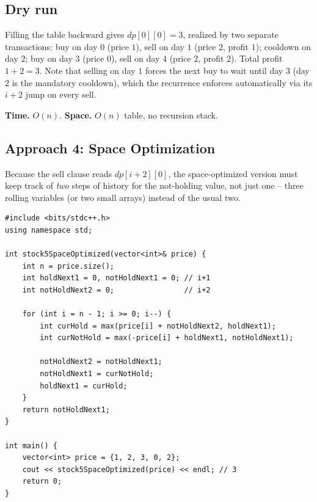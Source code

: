 \subsection*{Dry run}


Filling the table backward gives $\textit{dp}[0][0]=3$, realized by two
separate transactions: buy on day $0$ (price $1$), sell on day $1$
(price $2$, profit $1$); cooldown on day $2$; buy on day $3$ (price
$0$), sell on day $4$ (price $2$, profit $2$). Total profit
$1+2=3$. Note that selling on day $1$ forces the next buy to wait until
day $3$ (day $2$ is the mandatory cooldown), which the recurrence
enforces automatically via its $i{+}2$ jump on every sell.

\begin{complexitybox}
\textbf{Time.} $O(n)$.
\textbf{Space.} $O(n)$ table, no recursion stack.
\end{complexitybox}

\subsection*{Approach 4: Space Optimization}

\begin{ideabox}
Because the sell clause reads $\textit{dp}[i+2][0]$, the space-optimized
version must keep track of \emph{two} steps of history for the
not-holding value, not just one -- three rolling variables (or two small
arrays) instead of the usual two.
\end{ideabox}

\begin{lstlisting}
#include <bits/stdc++.h>
using namespace std;

int stock5SpaceOptimized(vector<int>& price) {
    int n = price.size();
    int holdNext1 = 0, notHoldNext1 = 0; // i+1
    int notHoldNext2 = 0;                // i+2

    for (int i = n - 1; i >= 0; i--) {
        int curHold = max(price[i] + notHoldNext2, holdNext1);
        int curNotHold = max(-price[i] + holdNext1, notHoldNext1);

        notHoldNext2 = notHoldNext1;
        notHoldNext1 = curNotHold;
        holdNext1 = curHold;
    }
    return notHoldNext1;
}

int main() {
    vector<int> price = {1, 2, 3, 0, 2};
    cout << stock5SpaceOptimized(price) << endl; // 3
    return 0;
}
\end{lstlisting}

